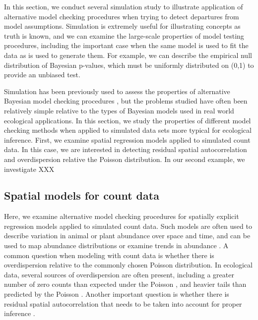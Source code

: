 \documentclass[12pt,english]{article}
\begin{document}
\begin{spacing}{1.9}
In this section, we conduct several simulation study to illustrate application of alternative model checking procedures when trying to detect departures from model assumptions.  Simulation is extremely useful for illustrating concepts as truth is known, and we can examine the large-scale properties of model testing procedures, including the important case when the same model is used to fit the data as is used to generate them.  For example, we can describe the empirical null distribution of Bayesian p-values, which must be uniformly distributed on (0,1) to provide an unbiased test.

Simulation has been previously used to assess the properties of alternative Bayesian model checking procedures \citep[e.g.][]{Gosselin2011,YuanJohnson2012,Zhang2014}, but the problems studied have often been relatively simple relative to the types of Bayesian models used in real world ecological applications.  In this section, we study the properties of different model checking methods when applied to simulated data sets more typical for ecological inference.
First, we examine spatial regression models applied to simulated count data.  In this case, we are interested in detecting residual spatial autocorrelation and overdispersion relative the Poisson distribution.  In our second example, we investigate XXX

\subsection{Spatial models for count data}

Here, we examine alternative model checking procedures for spatially explicit regression models applied to simulated count data.  Such models are often used to describe variation in animal or plant abundance over space and time, and can be used to map abundance distributions or examine trends in abundance \citep[see e.g.][]{SauerLink2011,ConnEtAl2014}.  A common question when modeling with count data is whether there is overdispersion relative to the commonly chosen Poisson distribution.  In ecological data, several sources of overdispersion are often present, including a greater number of zero counts than expected under the Poisson \citep[zero inflation;][]{AgarwalEtAl2002}, and heavier tails than predicted by the Poisson \citep{PottsElith2006,VerHoefBoveng2007}.  Another important question is whether there is residual spatial autocorrelation that needs to be taken into account for proper inference \citep{Legendre1993,LichsteinEtAl2002}.


\end{spacing}
\end{document}
